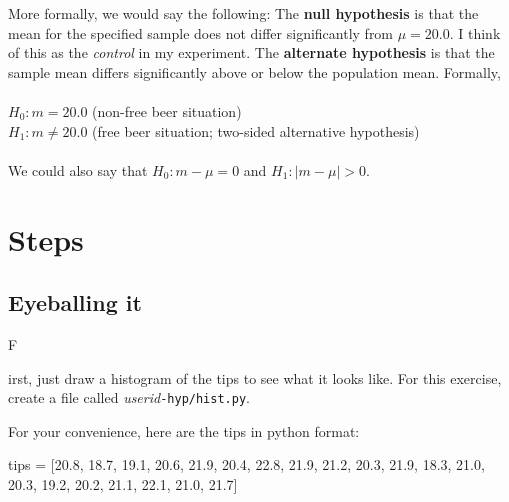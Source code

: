 \documentclass[titlepage]{tufte-book}
\newcounter{problem}
\newcommand{\step}[1]{{}
\vspace{4pt} \noindent {\bf \theproblem. }#1\addtocounter{problem}{1}}
\begin{document}
\begin{fullwidth}
More formally, we would say the following: The {\bf null hypothesis} is that the mean for the specified sample does not differ significantly from $\mu = 20.0$.  I think of this as the {\em control} in my experiment. The {\bf alternate hypothesis} is that the sample mean differs significantly above or below the population mean.  Formally,\\
~\\
$H_0: m = 20.0$ (non-free beer situation)\\
$H_1: m \neq 20.0$ (free beer situation; two-sided alternative hypothesis)\\
~\\
\noindent We could also say that $H_0: m - \mu = 0$ and $H_1: |m-\mu| > 0$.

\section{Steps}

\subsection{Eyeballing it}

\step First, just draw a histogram of the tips to see what it looks like. For this exercise, create a file called {\em userid}{\tt -hyp/hist.py}.


For your convenience, here are the tips in python format:

\begin{pyverbatim}
tips = [20.8, 18.7, 19.1, 20.6, 21.9, 20.4, 22.8,
        21.9, 21.2, 20.3, 21.9, 18.3, 21.0, 20.3,
        19.2, 20.2, 21.1, 22.1, 21.0, 21.7]
\end{pyverbatim}


\end{fullwidth}
\end{document}
